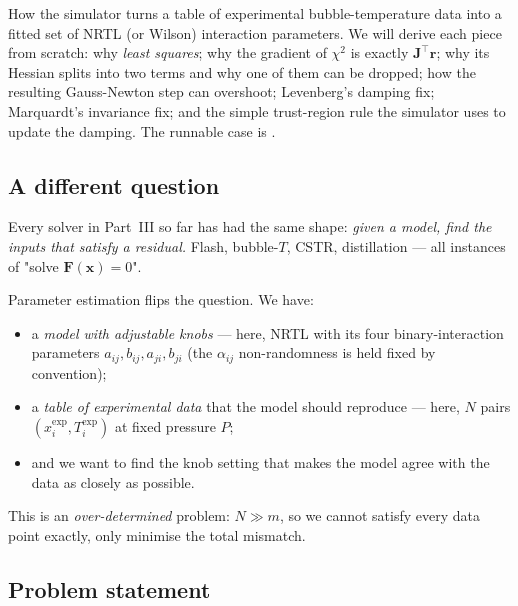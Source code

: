 \documentclass[11pt,a4paper]{article}
\newcommand{\xv}{\mathbf{x}}
\newcommand{\Fv}{\mathbf{F}}
\newcommand{\Jac}{\mathbf{J}}
\newcommand{\rv}{\mathbf{r}}                          %
\begin{document}
\begin{whatyoulllearn}
How the simulator turns a table of experimental bubble-temperature
data into a fitted set of NRTL (or Wilson) interaction parameters.
We will derive each piece from scratch: why \emph{least squares}; why
the gradient of $\chi^2$ is exactly $\Jac^{\!\top}\rv$; why its
Hessian splits into two terms and why one of them can be dropped;
how the resulting Gauss-Newton step can overshoot; Levenberg's
damping fix; Marquardt's invariance fix; and the simple
trust-region rule the simulator uses to update the damping. The
runnable case is .
\end{whatyoulllearn}

\subsection{A different question}

Every solver in Part~III so far has had the same shape: \emph{given
a model, find the inputs that satisfy a residual.} Flash,
bubble-$T$, CSTR, distillation --- all instances of "solve
$\Fv(\xv) = 0$".

Parameter estimation flips the question. We have:
\begin{itemize}[leftmargin=*,nosep]
  \item a \emph{model with adjustable knobs} --- here, NRTL with its
        four binary-interaction parameters $a_{ij}, b_{ij}, a_{ji},
        b_{ji}$ (the $\alpha_{ij}$ non-randomness is held fixed by
        convention);
  \item a \emph{table of experimental data} that the model should
        reproduce --- here, $N$ pairs $(x^{\mathrm{exp}}_i,
        T^{\mathrm{exp}}_i)$ at fixed pressure $P$;
  \item and we want to find the knob setting that makes the model
        agree with the data as closely as possible.
\end{itemize}
This is an \emph{over-determined} problem: $N \gg m$, so we cannot
satisfy every data point exactly, only minimise the total mismatch.

\subsection{Problem statement}
\end{document}
